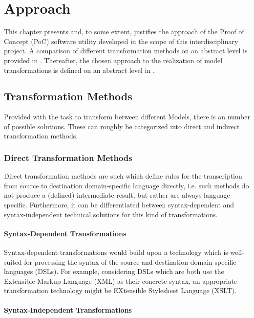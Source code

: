 \chapter{Approach}
\label{chap:approach}

This chapter presents and, to some extent, justifies the approach of the Proof of Concept (PoC) software utility developed in the scope of this interdisciplinary project. A comparison of different transformation methods on an abstract level is provided in . Thereafter, the chosen approach to the realization of model transformations is defined on an abstract level in .

\section{Transformation Methods}
\label{sec:approach:transform}

Provided with the task to transform between different Models, there is an number of possible solutions. These can roughly be categorized into direct and indirect transformation methods.

\subsection{Direct Transformation Methods}

Direct transformation methods are such which define rules for the transcription from source to destination domain-specific language directly, i.e. such methods do not produce a (defined) intermediate result, but rather are always language-specific. Furthermore, it can be differentiated between syntax-dependent and syntax-independent technical solutions for this kind of transformations.

\subsubsection{Syntax-Dependent Transformations}

Syntax-dependent transformations would build upon a technology which is well-suited for processing the syntax of the source and destination domain-specific languages (DSLs). For example, considering DSLs which are both use the Extensible Markup Language (XML) as their concrete syntax, an appropriate transformation technology might be EXtensible Stylesheet Language (XSLT).

\subsubsection{Syntax-Independent Transformations}

